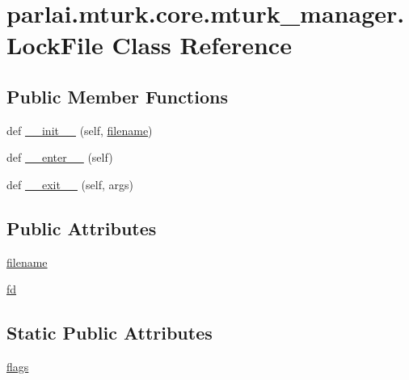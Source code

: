 \hypertarget{classparlai_1_1mturk_1_1core_1_1mturk__manager_1_1LockFile}{}\section{parlai.\+mturk.\+core.\+mturk\+\_\+manager.\+Lock\+File Class Reference}
\label{classparlai_1_1mturk_1_1core_1_1mturk__manager_1_1LockFile}
\subsection*{Public Member Functions}
\begin{DoxyCompactItemize}
\item 
def \hyperlink{classparlai_1_1mturk_1_1core_1_1mturk__manager_1_1LockFile_ad09cb4ad34484f02d53ac73f5e208f24}{\+\_\+\+\_\+init\+\_\+\+\_\+} (self, \hyperlink{classparlai_1_1mturk_1_1core_1_1mturk__manager_1_1LockFile_ab536375bf2e03483884bd64b53c8fdab}{filename})
\item 
def \hyperlink{classparlai_1_1mturk_1_1core_1_1mturk__manager_1_1LockFile_a38867b01234e0727677986bd6001ab8e}{\+\_\+\+\_\+enter\+\_\+\+\_\+} (self)
\item 
def \hyperlink{classparlai_1_1mturk_1_1core_1_1mturk__manager_1_1LockFile_ac49e4e875de89ea6e8faaee9179991e8}{\+\_\+\+\_\+exit\+\_\+\+\_\+} (self, args)
\end{DoxyCompactItemize}
\subsection*{Public Attributes}
\begin{DoxyCompactItemize}
\item 
\hyperlink{classparlai_1_1mturk_1_1core_1_1mturk__manager_1_1LockFile_ab536375bf2e03483884bd64b53c8fdab}{filename}
\item 
\hyperlink{classparlai_1_1mturk_1_1core_1_1mturk__manager_1_1LockFile_ae6aa99d2fc2763a5541652e7afb3bba9}{fd}
\end{DoxyCompactItemize}
\subsection*{Static Public Attributes}
\begin{DoxyCompactItemize}
\item 
\hyperlink{classparlai_1_1mturk_1_1core_1_1mturk__manager_1_1LockFile_ae89be8215dce410b9f1cf34ce40f7108}{flags}
\end{DoxyCompactItemize}


